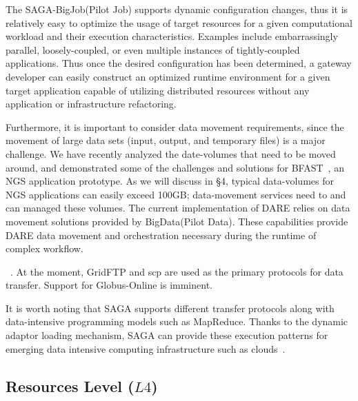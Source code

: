 \documentclass[]{svjour3}
\begin{document}
The SAGA-BigJob(Pilot Job) supports dynamic configuration changes, thus it is
relatively easy to optimize the usage of target resources for a given
computational workload and their execution characteristics. Examples include
embarrassingly parallel, loosely-coupled, or even multiple instances of
tightly-coupled applications. Thus once the desired configuration has
been determined, a gateway developer can easily construct an optimized
runtime environment for a given target application capable of
utilizing distributed resources without any application or
infrastructure refactoring.


Furthermore, it is important to consider data movement requirements,
since the movement of large data sets (input, output, and temporary
files) is a major challenge. We have recently analyzed the
date-volumes that need to be moved around, and demonstrated some of
the challenges and solutions for BFAST~\cite{dare-ecmls11}, an NGS
application prototype.  As we will discuss in
\S4, typical data-volumes for NGS applications can easily exceed
100GB; data-movement services need to and can managed these
volumes. The current implementation of DARE relies on data movement solutions
provided by BigData(Pilot Data).  These capabilities provide DARE data movement 
and orchestration necessary during the runtime of complex workflow.


~.   At the moment, GridFTP and scp
are used as the primary protocols for data transfer. Support for
Globus-Online is imminent.  ~ 

It is worth noting that SAGA supports different transfer protocols
along with data-intensive programming models such as MapReduce.
Thanks to the dynamic adaptor loading mechanism, SAGA can provide
these execution patterns for emerging data intensive computing
infrastructure such as clouds~\cite{bigjob_cloudcom10,saga_bigjob_condor_cloud}.

\subsection{Resources Level ($L4$)} 
\end{document}
